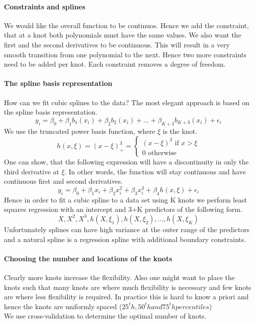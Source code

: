 \documentclass[../document.tex]{subfiles}
\begin{document}
	\paragraph{Constraints and splines}
	We would like the overall function to be continuos. Hence we add the constraint, that at a knot both polynomials must have the same values. We also want the first and the second derivatives to be continuous. This will result in a very smooth transition from one polynomial to the next. Hence two more constraints need to be added per knot. Each constraint removes a degree of freedom.
	\paragraph{The spline basis representation}
	How can we fit cubic splines to the data? The most elegant approach is based on the spline basis representation.
	\begin{equation}
		y_{i}=\beta_{0}+\beta_{1}b_{1}(x_{i})+\beta_{2}b_{2}(x_{i})+...+\beta_{K+3}b_{K+3}(x_{i})+\epsilon_{i}
	\end{equation}
	We use the truncated power basis function, where \(\xi\) is the knot.
	\begin{equation}
		h(x,\xi)=(x-\xi)_{+}^3=
		\begin{cases}
			(x-\xi)^3 \text{  if  } x > \xi\\
			0 \text{  otherwise  }
		\end{cases}
	\end{equation}
	One can show, that the following expression will have a discontinuity in only the third derivative at \(\xi\). In other words, the function will stay continuous and have continuous first and second derivatives.
	\begin{equation}
		y_{i}=\beta_{0}+\beta_{1}x_{i}+\beta_{2}x_{i}^2+\beta_{3}x_{i}^3+\beta_{4}h(x,\xi)+\epsilon_{i}
	\end{equation}
	Hence in order to fit a cubic spline to a data set using K knots we perform least squares regression with an intercept and 3+K predictors of the following form.
	\begin{equation}
		X, X^2, X^3, h(X,\xi_{1}),h(X,\xi_{2}),...,h(X,\xi_{K})
	\end{equation}
	Unfortunately splines can have high variance at the outer range of the predictors and a natural spline is a regression spline with additional boundary constraints.
	\paragraph{Choosing the number and locations of the knots}
	Clearly more knots increase the flexibility. Also one might want to place the knots such that many knots are where much flexibility is necessary and few knots are where less flexibility is required. In practice this is hard to know a priori and hence the knots are uniformly spaced (\(25^th,50^th and 75^th percentiles\))\\
	We use cross-validation to determine the optimal number of knots.
\end{document}
